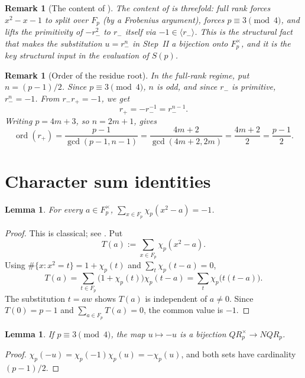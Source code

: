 \documentclass[preprint,5p,times,twocolumn]{elsarticle}
\def\F{F}\def\Z{Z}\def\Q{Q}\def\R{R}\def\N{N}%
\def\QR{QR}\def\NQR{NQR}}
\newtheorem{lemma}[theorem]{Lemma}
\newtheorem{remark}[theorem]{Remark}
\DeclareMathOperator{\ord}{ord}
\newcommand{\Z}{\mathbb{Z}}
\newcommand{\Q}{\mathbb{Q}}
\newcommand{\R}{\mathbb{R}}
\newcommand{\F}{\mathbb{F}}
\newcommand{\N}{\mathbb{N}}
\newcommand{\QR}{\mathrm{QR}}
\newcommand{\NQR}{\mathrm{NQR}}
\begin{document}
\begin{remark}[The content of ]\label{rem:content-G}
The content of  is threefold: full rank forces 
\(x^2-x-1\) to split over \(\F_p\) (by a Frobenius argument), 
forces \(p\equiv 3\pmod 4\), and lifts the primitivity of 
\(-r_-^2\) to \(r_-\) itself via \(-1\in\langle r_-\rangle\). 
This is the structural fact that makes the substitution
\(u=r_-^n\) in Step~II a bijection onto \(\F_p^\times\), and it is
the key structural input in the evaluation of \(S(p)\).
\end{remark}

\begin{remark}[Order of the residue root]
In the full-rank regime, put \(n=(p-1)/2\). Since
\(p\equiv3\pmod4\), \(n\) is odd, and since \(r_-\) is primitive,
\(r_-^n=-1\). From \(r_-r_+=-1\), we get
\[
r_+=-r_-^{-1}=r_-^{n-1}.
\]
Writing \(p=4m+3\), so \(n=2m+1\), gives
\[
\ord(r_+)=\frac{p-1}{\gcd(p-1,n-1)}
=\frac{4m+2}{\gcd(4m+2,2m)}
=\frac{4m+2}{2}
=\frac{p-1}{2}.
\]
\end{remark}


\section{Character sum identities}\label{sec:character-sums}

\begin{lemma}\label{lem:S}
For every $a\in\F_p^\times$,
$\displaystyle\sum_{x\in\F_p}\chi_p(x^2-a)=-1$.
\end{lemma}

\begin{proof}
This is classical; see \cite{IrelandRosen1990}. 
Put
\[
T(a):=\sum_{x\in\F_p}\chi_p(x^2-a).
\]
Using $\#\{x:x^2=t\}=1+\chi_p(t)$ and $\sum_t\chi_p(t-a)=0$,
\[
T(a)=\sum_{t\in\F_p}\bigl(1+\chi_p(t)\bigr)\chi_p(t-a)
=\sum_t\chi_p\bigl(t(t-a)\bigr).
\]
The substitution $t=aw$ shows $T(a)$ is independent of $a\ne0$.
Since $T(0)=p-1$ and $\sum_{a\in\F_p}T(a)=0$, the common value 
is $-1$.
\end{proof}

\begin{lemma}\label{lem:D}
If $p\equiv 3\pmod 4$, the map $u\mapsto -u$ is a bijection 
$\QR_p^\times\to\NQR_p$.
\end{lemma}

\begin{proof}
$\chi_p(-u)=\chi_p(-1)\chi_p(u)=-\chi_p(u)$, and both sets 
have cardinality $(p-1)/2$.
\end{proof}
\end{document}
